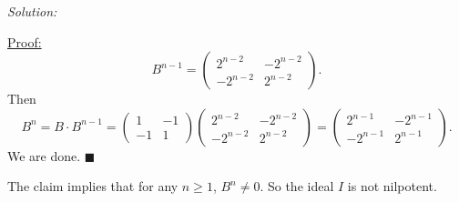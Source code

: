 \documentclass[a4paper, 12pt]{article}
\newenvironment{solution}
    {\textit{Solution:}}
    {}
\newenvironment{claimproof}[1]{\par\noindent\underline{Proof:}\space#1}{\hfill $\blacksquare$}
\begin{document}
\begin{solution}
\begin{claimproof}
\[B^{n-1}=\begin{pmatrix}
    2^{n-2}&-2^{n-2}\\ 
    -2^{n-2}&2^{n-2}
\end{pmatrix}.\]
Then 
\[B^n=B\cdot B^{n-1}=\begin{pmatrix}
    1&-1\\ 
    -1&1
\end{pmatrix}\begin{pmatrix}
    2^{n-2}&-2^{n-2}\\ 
    -2^{n-2}&2^{n-2}
\end{pmatrix}=\begin{pmatrix}
    2^{n-1}&-2^{n-1}\\ 
    -2^{n-1}&2^{n-1}
\end{pmatrix}.\]
We are done.
\end{claimproof}

The claim implies that for any \(n\geq 1\), \(B^n\neq 0\). So the ideal \(I\) is not nilpotent.
\end{solution}
\end{document}
